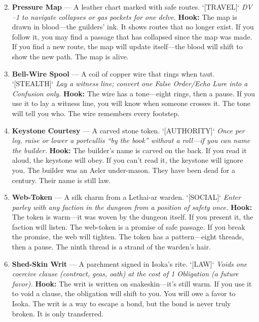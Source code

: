 \begin{enumerate}
\setcounter{enumi}{1}
\item \textbf{Pressure Map} --- A leather chart marked with safe routes. `[TRAVEL]`
  \hfill \textit{DV --1 to navigate collapses or gas pockets for one delve.}
  \textbf{Hook:} The map is drawn in blood---the guilders' ink. It shows routes that no longer exist. If you follow it, you may find a passage that has collapsed since the map was made. If you find a new route, the map will update itself---the blood will shift to show the new path. The map is alive.

\item \textbf{Bell-Wire Spool} --- A coil of copper wire that rings when taut. `[STEALTH]`
  \hfill \textit{Lay a witness line; convert one False Order/Echo Lure into a Confusion only.}
  \textbf{Hook:} The wire has a tone---eight rings, then a pause. If you use it to lay a witness line, you will know when someone crosses it. The tone will tell you who. The wire remembers every footstep.

\item \textbf{Keystone Courtesy} --- A carved stone token. `[AUTHORITY]`
  \hfill \textit{Once per leg, raise or lower a portcullis ``by the book'' without a roll---if you can name the builder.}
  \textbf{Hook:} The builder's name is carved on the back. If you read it aloud, the keystone will obey. If you can't read it, the keystone will ignore you. The builder was an Aeler under-mason. They have been dead for a century. Their name is still law.

\item \textbf{Web-Token} --- A silk charm from a Lethai-ar warden. `[SOCIAL]`
  \hfill \textit{Enter parley with any faction in the dungeon from a position of safety once.}
  \textbf{Hook:} The token is warm---it was woven by the dungeon itself. If you present it, the faction will listen. The web-token is a promise of safe passage. If you break the promise, the web will tighten. The token has a pattern---eight threads, then a pause. The ninth thread is a strand of the warden's hair.

\item \textbf{Shed-Skin Writ} --- A parchment signed in Isoka's rite. `[LAW]`
  \hfill \textit{Voids one coercive clause (contract, geas, oath) at the cost of 1 Obligation (a future favor).}
  \textbf{Hook:} The writ is written on snakeskin---it's still warm. If you use it to void a clause, the obligation will shift to you. You will owe a favor to Isoka. The writ is a way to escape a bond, but the bond is never truly broken. It is only transferred.


\end{enumerate}
